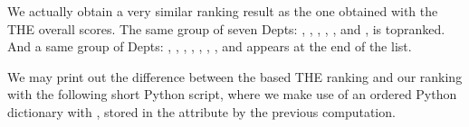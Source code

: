 \documentclass[a4paper,12pt,english]{sphinxhowto}
\begin{document}
We actually obtain a very similar ranking result as the one obtained with the THE overall scores. The same group of seven Depts: , , , , ,  and , is top\sphinxhyphen{}ranked. And a same group of Depts: , , , , , , , and  appears at the end of the list.

We may print out the difference between the  based THE ranking and our  ranking with the following short Python script, where we make use of an ordered Python dictionary with , stored in the  attribute by the previous computation.
\def\sphinxLiteralBlockLabel{\label{\detokenize{tutorial:printrobustnetflowsranking}}}
\end{document}
